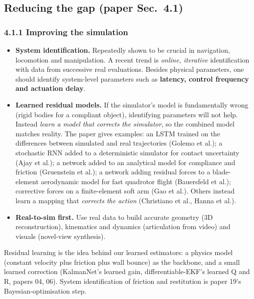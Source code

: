 \documentclass[11pt,a4paper]{article}
\begin{document}
\subsection{Reducing the gap \textnormal{(paper Sec.~4.1)}}

\subsubsection*{4.1.1 Improving the simulation}
\begin{itemize}
\item \textbf{System identification.} Repeatedly shown to be crucial in navigation, locomotion and
manipulation. A recent trend is \emph{online, iterative} identification with data from successive
real evaluations. Besides physical parameters, one should identify system-level parameters such as
\textbf{latency, control frequency and actuation delay}.
\item \textbf{Learned residual models.} If the simulator's model is fundamentally wrong (rigid
bodies for a compliant object), identifying parameters will not help. Instead \emph{learn a
model that corrects the simulator}, so the combined model matches reality. The paper gives
examples: an LSTM trained on the differences between simulated and real trajectories (Golemo et
al.); a stochastic RNN added to a deterministic simulator for contact uncertainty (Ajay et al.);
a network added to an analytical model for compliance and friction (Gruenstein et al.); a network
adding residual forces to a blade-element aerodynamic model for fast quadrotor flight (Bauersfeld
et al.); corrective forces on a finite-element soft arm (Gao et al.). Others instead learn a
mapping that \emph{corrects the action} (Christiano et al., Hanna et al.).
\item \textbf{Real-to-sim first.} Use real data to build accurate geometry (3D reconstruction),
kinematics and dynamics (articulation from video) and visuals (novel-view synthesis).
\end{itemize}

\begin{ours}
Residual learning is the idea behind our learned estimators: a physics model (constant velocity
plus friction plus wall bounce) as the backbone, and a small learned correction
(KalmanNet's learned gain, differentiable-EKF's learned Q and R, papers 04, 06). System
identification of friction and restitution is paper 19's Bayesian-optimisation step.
\end{ours}
\end{document}
